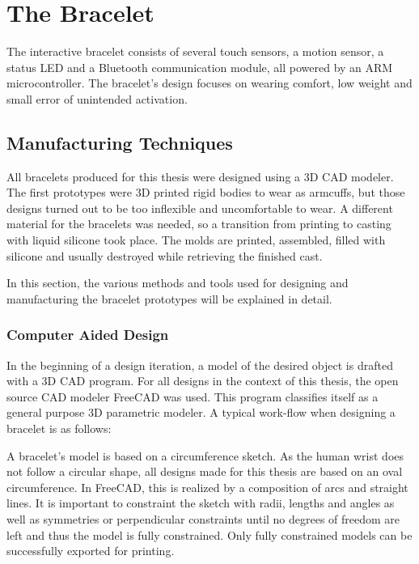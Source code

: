 \chapter{The Bracelet}

The interactive bracelet consists of several touch sensors, a motion sensor, a status \ac{LED} and a Bluetooth communication module, all powered by an ARM microcontroller. The bracelet's design focuses on wearing comfort, low weight and small error of unintended activation.

\section{Manufacturing Techniques}

All bracelets produced for this thesis were designed using a 3D \ac{CAD} modeler. The first prototypes were 3D printed rigid bodies to wear as armcuffs, but those designs turned out to be too inflexible and uncomfortable to wear. A different material for the bracelets was needed, so a transition from printing to casting with liquid silicone took place. The molds are printed, assembled, filled with silicone and usually destroyed while retrieving the finished cast.

In this section, the various methods and tools used for designing and manufacturing the bracelet prototypes will be explained in detail.

\subsection{Computer Aided Design}
In the beginning of a design iteration, a model of the desired object is drafted with a 3D \ac{CAD} program. For all designs in the context of this thesis, the open source \ac{CAD} modeler FreeCAD\cite{freecad} was used. This program classifies itself as a general purpose 3D parametric modeler. A typical work-flow when designing a bracelet is as follows:

A bracelet's model is based on a circumference sketch. As the human wrist does not follow a circular shape, all designs made for this thesis are based on an oval circumference. In FreeCAD, this is realized by a composition of arcs and straight lines. It is important to constraint the sketch with radii, lengths and angles as well as symmetries or perpendicular constraints until no degrees of freedom are left and thus the model is fully constrained. Only fully constrained models can be successfully exported for printing.

